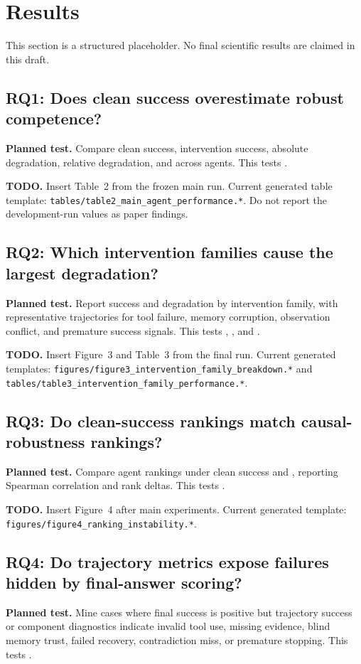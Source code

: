 \section{Results}

This section is a structured placeholder. No final scientific results are claimed in this draft.

\subsection{RQ1: Does clean success overestimate robust competence?}
\textbf{Planned test.} Compare clean success, intervention success, absolute degradation, relative degradation, and \acrs across agents. This tests .

\textbf{TODO.} Insert Table~2 from the frozen main run. Current generated table template: \texttt{tables/table2\_main\_agent\_performance.*}. Do not report the development-run values as paper findings.

\subsection{RQ2: Which intervention families cause the largest degradation?}
\textbf{Planned test.} Report success and degradation by intervention family, with representative trajectories for tool failure, memory corruption, observation conflict, and premature success signals. This tests , , and .

\textbf{TODO.} Insert Figure~3 and Table~3 from the final run. Current generated templates: \texttt{figures/figure3\_intervention\_family\_breakdown.*} and \texttt{tables/table3\_intervention\_family\_performance.*}.

\subsection{RQ3: Do clean-success rankings match causal-robustness rankings?}
\textbf{Planned test.} Compare agent rankings under clean success and \acrs, reporting Spearman correlation and rank deltas. This tests .

\textbf{TODO.} Insert Figure~4 after main experiments. Current generated template: \texttt{figures/figure4\_ranking\_instability.*}.

\subsection{RQ4: Do trajectory metrics expose failures hidden by final-answer scoring?}
\textbf{Planned test.} Mine cases where final success is positive but trajectory success or component diagnostics indicate invalid tool use, missing evidence, blind memory trust, failed recovery, contradiction miss, or premature stopping. This tests .

